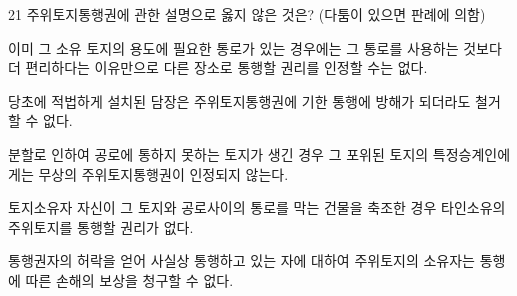 \begin{question}{21}
주위토지통행권에 관한 설명으로 옳지 않은 것은? (다툼이 있으면 판례에 의함)
\begin{choices}
  \item 이미 그 소유 토지의 용도에 필요한 통로가 있는 경우에는 그 통로를 사용하는 것보다 더 편리하다는 이유만으로 다른 장소로 통행할 권리를 인정할 수는 없다.
  \item 당초에 적법하게 설치된 담장은 주위토지통행권에 기한 통행에 방해가 되더라도 철거할 수 없다.
  \item 분할로 인하여 공로에 통하지 못하는 토지가 생긴 경우 그 포위된 토지의 특정승계인에게는 무상의 주위토지통행권이 인정되지 않는다.
  \item 토지소유자 자신이 그 토지와 공로사이의 통로를 막는 건물을 축조한 경우 타인소유의 주위토지를 통행할 권리가 없다.
  \item 통행권자의 허락을 얻어 사실상 통행하고 있는 자에 대하여 주위토지의 소유자는 통행에 따른 손해의 보상을 청구할 수 없다.
\end{choices}
\end{question}
